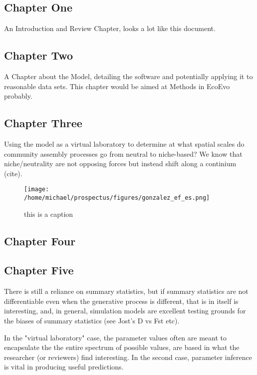 \documentclass[]{article}
\begin{document}
\subsection{Chapter One}

An Introduction and Review Chapter, looks a lot like this document. 


\subsection{Chapter Two}

A Chapter about the Model, detailing the software and potentially applying it to reasonable data sets.
This chapter would be aimed at Methods in EcoEvo probably.

\subsection{Chapter Three}

Using the model as a virtual laboratory \citep{rollsback_agent_2005} to determine at what spatial scales do community assembly processes go from neutral to niche-based? We know that niche/neutrality are not opposing forces but instead shift along a continium (cite).


\begin{figure}[H]
\centering
\texttt{[image: /home/michael/prospectus/figures/gonzalez\_ef\_es.png]}
\caption{this is a caption}
\end{figure}

\subsection{Chapter Four}
\subsection{Chapter Five}






%
%
%
\clearpage
{
\footnotesize

}
There is still a reliance on summary statistics, but if summary
statistics are not differentiable even when the  generative process is
different, that is in itself is interesting, and, in general, simulation
models are excellent testing grounds for the biases of summary
statistics (see Jost's D vs Fst etc).

In the "virtual laboratory" case, the parameter values often are meant
to encapsulate the the entire spectrum of possible values, are based in
what the researcher (or reviewers) find interesting. In the second case,
parameter inference is vital in producing useful predictions.
\end{document}
